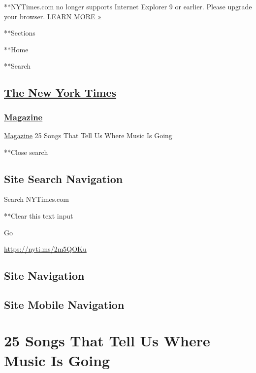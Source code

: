  **NYTimes.com no longer supports Internet Explorer 9 or earlier. Please
upgrade your browser.
\href{http://www.nytimes3xbfgragh.onion/content/help/site/ie9-support.html}{LEARN
MORE »}

**Sections

**Home

**Search

\hypertarget{the-new-york-times}{%
\subsection{\texorpdfstring{\href{http://www.nytimes3xbfgragh.onion/}{The
New York Times}}{The New York Times}}\label{the-new-york-times}}

\hypertarget{-magazine-}{%
\subsubsection{\texorpdfstring{
\href{https://www.nytimes3xbfgragh.onion/section/magazine}{Magazine}
}{ Magazine }}\label{-magazine-}}

 \href{https://www.nytimes3xbfgragh.onion/section/magazine}{Magazine}
\textbar{}25 Songs That Tell Us Where Music Is Going

**Close search

\hypertarget{site-search-navigation}{%
\subsection{Site Search Navigation}\label{site-search-navigation}}

Search NYTimes.com

**Clear this text input

Go

\url{https://nyti.ms/2m5QOKu}

\hypertarget{site-navigation}{%
\subsection{Site Navigation}\label{site-navigation}}

\hypertarget{site-mobile-navigation}{%
\subsection{Site Mobile Navigation}\label{site-mobile-navigation}}

\hypertarget{25-songs-that-tell-us-where-music-is-going}{%
\section{25 Songs That Tell Us Where Music Is
Going}\label{25-songs-that-tell-us-where-music-is-going}}

